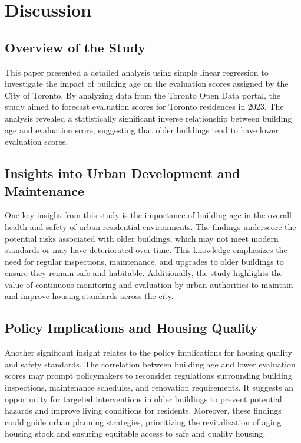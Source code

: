 \documentclass[
  letterpaper,
  DIV=11,
  numbers=noendperiod]{scrartcl}
\begin{document}
\hypertarget{sec-discussion}{%
\section{Discussion}\label{sec-discussion}}

\hypertarget{overview-of-the-study}{%
\subsection{Overview of the Study}\label{overview-of-the-study}}

This paper presented a detailed analysis using simple linear regression
to investigate the impact of building age on the evaluation scores
assigned by the City of Toronto. By analyzing data from the Toronto Open
Data portal, the study aimed to forecast evaluation scores for Toronto
residences in 2023. The analysis revealed a statistically significant
inverse relationship between building age and evaluation score,
suggesting that older buildings tend to have lower evaluation scores.

\hypertarget{insights-into-urban-development-and-maintenance}{%
\subsection{Insights into Urban Development and
Maintenance}\label{insights-into-urban-development-and-maintenance}}

One key insight from this study is the importance of building age in the
overall health and safety of urban residential environments. The
findings underscore the potential risks associated with older buildings,
which may not meet modern standards or may have deteriorated over time.
This knowledge emphasizes the need for regular inspections, maintenance,
and upgrades to older buildings to ensure they remain safe and
habitable. Additionally, the study highlights the value of continuous
monitoring and evaluation by urban authorities to maintain and improve
housing standards across the city.

\hypertarget{policy-implications-and-housing-quality}{%
\subsection{Policy Implications and Housing
Quality}\label{policy-implications-and-housing-quality}}

Another significant insight relates to the policy implications for
housing quality and safety standards. The correlation between building
age and lower evaluation scores may prompt policymakers to reconsider
regulations surrounding building inspections, maintenance schedules, and
renovation requirements. It suggests an opportunity for targeted
interventions in older buildings to prevent potential hazards and
improve living conditions for residents. Moreover, these findings could
guide urban planning strategies, prioritizing the revitalization of
aging housing stock and ensuring equitable access to safe and quality
housing.
\end{document}
